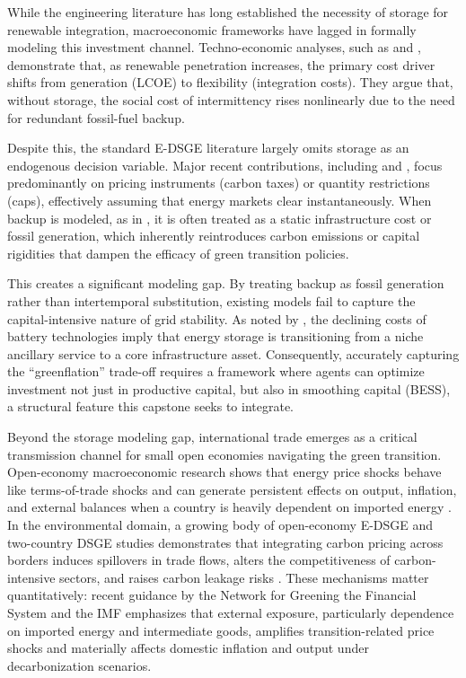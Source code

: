 \documentclass[12pt, a4paper]{article}
\begin{document}
	While the engineering literature has long established the necessity of storage for renewable integration, macroeconomic frameworks have lagged in formally modeling this investment channel. Techno-economic analyses, such as \citet{zakeri2015} and \citet{lund2015}, demonstrate that, as renewable penetration increases, the primary cost driver shifts from generation (LCOE) to flexibility (integration costs). They argue that, without storage, the social cost of intermittency rises nonlinearly due to the need for redundant fossil-fuel backup.
	
	Despite this, the standard E-DSGE literature largely omits storage as an endogenous decision variable. Major recent contributions, including \citet{batten2020} and \citet{annicchiarico2021}, focus predominantly on pricing instruments (carbon taxes) or quantity restrictions (caps), effectively assuming that energy markets clear instantaneously. When backup is modeled, as in \citet{schreiner2020investing}, it is often treated as a static infrastructure cost or fossil generation, which inherently reintroduces carbon emissions or capital rigidities that dampen the efficacy of green transition policies.
	
	This creates a significant modeling gap. By treating backup as fossil generation rather than intertemporal substitution, existing models fail to capture the capital-intensive nature of grid stability. As noted by \citet{kittner2017}, the declining costs of battery technologies imply that energy storage is transitioning from a niche ancillary service to a core infrastructure asset. Consequently, accurately capturing the ``greenflation'' trade-off requires a framework where agents can optimize investment not just in productive capital, but also in smoothing capital (BESS), a structural feature this capstone seeks to integrate.
	
	Beyond the storage modeling gap, international trade emerges as a critical transmission channel for small open economies navigating the green transition. Open-economy macroeconomic research shows that energy price shocks behave like terms-of-trade shocks and can generate persistent effects on output, inflation, and external balances when a country is heavily dependent on imported energy \citep{obstfeld1995, corsetti2010}. In the environmental domain, a growing body of open-economy E-DSGE and two-country DSGE studies demonstrates that integrating carbon pricing across borders induces spillovers in trade flows, alters the competitiveness of carbon-intensive sectors, and raises carbon leakage risks \citep{bohringer2018, balke2022}. These mechanisms matter quantitatively: recent guidance by the Network for Greening the Financial System \citep{ngfs2022} and the IMF \citep{imf2021} emphasizes that external exposure, particularly dependence on imported energy and intermediate goods, amplifies transition-related price shocks and materially affects domestic inflation and output under decarbonization scenarios.
	
\end{document}
